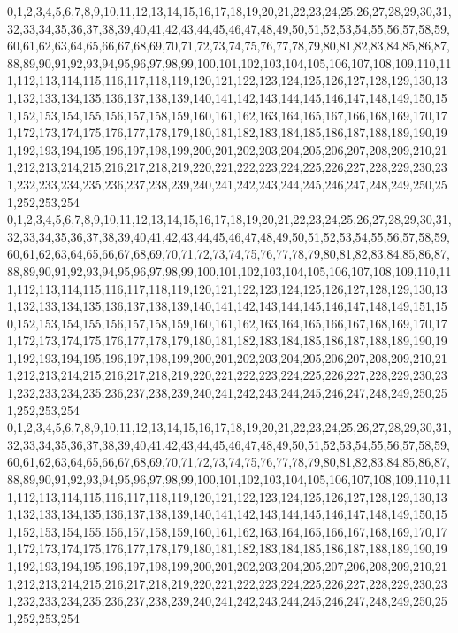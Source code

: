 \documentclass[12pt]{article}
\begin{document}
{0,1,2,3,4,5,6,7,8,9,10,11,12,13,14,15,16,17,18,19,20,21,22,23,24,25,26,27,28,29,30,31,32,33,34,35,36,37,38,39,40,41,42,43,44,45,46,47,48,49,50,51,52,53,54,55,56,57,58,59,60,61,62,63,64,65,66,67,68,69,70,71,72,73,74,75,76,77,78,79,80,81,82,83,84,85,86,87,88,89,90,91,92,93,94,95,96,97,98,99,100,101,102,103,104,105,106,107,108,109,110,111,112,113,114,115,116,117,118,119,120,121,122,123,124,125,126,127,128,129,130,131,132,133,134,135,136,137,138,139,140,141,142,143,144,145,146,147,148,149,150,151,152,153,154,155,156,157,158,159,160,161,162,163,164,165,167,166,168,169,170,171,172,173,174,175,176,177,178,179,180,181,182,183,184,185,186,187,188,189,190,191,192,193,194,195,196,197,198,199,200,201,202,203,204,205,206,207,208,209,210,211,212,213,214,215,216,217,218,219,220,221,222,223,224,225,226,227,228,229,230,231,232,233,234,235,236,237,238,239,240,241,242,243,244,245,246,247,248,249,250,251,252,253,254\\
0,1,2,3,4,5,6,7,8,9,10,11,12,13,14,15,16,17,18,19,20,21,22,23,24,25,26,27,28,29,30,31,32,33,34,35,36,37,38,39,40,41,42,43,44,45,46,47,48,49,50,51,52,53,54,55,56,57,58,59,60,61,62,63,64,65,66,67,68,69,70,71,72,73,74,75,76,77,78,79,80,81,82,83,84,85,86,87,88,89,90,91,92,93,94,95,96,97,98,99,100,101,102,103,104,105,106,107,108,109,110,111,112,113,114,115,116,117,118,119,120,121,122,123,124,125,126,127,128,129,130,131,132,133,134,135,136,137,138,139,140,141,142,143,144,145,146,147,148,149,151,150,152,153,154,155,156,157,158,159,160,161,162,163,164,165,166,167,168,169,170,171,172,173,174,175,176,177,178,179,180,181,182,183,184,185,186,187,188,189,190,191,192,193,194,195,196,197,198,199,200,201,202,203,204,205,206,207,208,209,210,211,212,213,214,215,216,217,218,219,220,221,222,223,224,225,226,227,228,229,230,231,232,233,234,235,236,237,238,239,240,241,242,243,244,245,246,247,248,249,250,251,252,253,254\\
0,1,2,3,4,5,6,7,8,9,10,11,12,13,14,15,16,17,18,19,20,21,22,23,24,25,26,27,28,29,30,31,32,33,34,35,36,37,38,39,40,41,42,43,44,45,46,47,48,49,50,51,52,53,54,55,56,57,58,59,60,61,62,63,64,65,66,67,68,69,70,71,72,73,74,75,76,77,78,79,80,81,82,83,84,85,86,87,88,89,90,91,92,93,94,95,96,97,98,99,100,101,102,103,104,105,106,107,108,109,110,111,112,113,114,115,116,117,118,119,120,121,122,123,124,125,126,127,128,129,130,131,132,133,134,135,136,137,138,139,140,141,142,143,144,145,146,147,148,149,150,151,152,153,154,155,156,157,158,159,160,161,162,163,164,165,166,167,168,169,170,171,172,173,174,175,176,177,178,179,180,181,182,183,184,185,186,187,188,189,190,191,192,193,194,195,196,197,198,199,200,201,202,203,204,205,207,206,208,209,210,211,212,213,214,215,216,217,218,219,220,221,222,223,224,225,226,227,228,229,230,231,232,233,234,235,236,237,238,239,240,241,242,243,244,245,246,247,248,249,250,251,252,253,254\\
}
\end{document}
